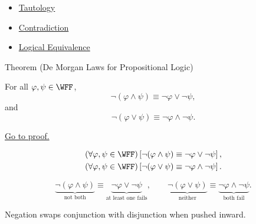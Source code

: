\begin{dependencies}
\begin{itemize}
  \item \hyperref[def:tautology-propositional-logic]{Tautology}
  \item \hyperref[def:contradiction-propositional-logic]{Contradiction}
  \item \hyperref[def:logical-equivalence-propositional-logic]{Logical Equivalence}
\end{itemize}
\end{dependencies}
\begin{theorembox}{Theorem (De Morgan Laws for Propositional Logic)}
\begin{theorem}
\label{thm:de-morgan-laws-propositional-logic}
For all \(\varphi,\psi\in\WFF\),
\[
\neg(\varphi\land\psi)
\equiv
\neg\varphi\lor\neg\psi,
\]
and
\[
\neg(\varphi\lor\psi)
\equiv
\neg\varphi\land\neg\psi.
\]

\noindent\hyperref[prf:de-morgan-laws-propositional-logic]{Go to proof.}
\end{theorem}
\end{theorembox}

\begin{remark*}
\[
\begin{gathered}
(\forall\varphi,\psi\in\WFF)
\left[
\neg(\varphi\land\psi)
\equiv
\neg\varphi\lor\neg\psi
\right],\\
(\forall\varphi,\psi\in\WFF)
\left[
\neg(\varphi\lor\psi)
\equiv
\neg\varphi\land\neg\psi
\right].
\end{gathered}
\]
\end{remark*}

\begin{remark*}
\[
\underbrace{\neg(\varphi\land\psi)}_{\text{not both}}
\equiv
\underbrace{\neg\varphi\lor\neg\psi}_{\text{at least one fails}},
\qquad
\underbrace{\neg(\varphi\lor\psi)}_{\text{neither}}
\equiv
\underbrace{\neg\varphi\land\neg\psi}_{\text{both fail}}.
\]
\end{remark*}

\begin{remark*}[Interpretation]
Negation swaps conjunction with disjunction when pushed inward.
\end{remark*}

